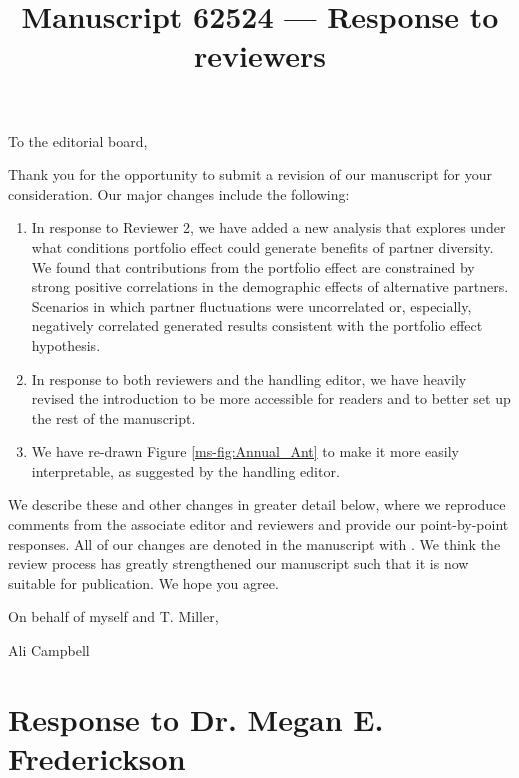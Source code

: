 \documentclass[12pt]{article}
\newcommand{\revise}[1]{{\color{blue}{#1}}}
\begin{document}
\title{Manuscript 62524 --- Response to reviewers}

\maketitle
\noindent To the editorial board,

Thank you for the opportunity to submit a revision of our manuscript for your consideration. Our major changes include the following:
\begin{enumerate}
	\item In response to Reviewer 2, we have added a new analysis that explores under what conditions portfolio effect could generate benefits of partner diversity. We found that contributions from the portfolio effect are constrained by strong positive correlations in the demographic effects of alternative partners. Scenarios in which partner fluctuations were uncorrelated or, especially, negatively correlated generated results consistent with the portfolio effect hypothesis.
	\item In response to both reviewers and the handling editor, we have heavily revised the introduction to be more accessible for readers and to better set up the rest of the manuscript.
	\item We have re-drawn Figure \ref{ms-fig:Annual_Ant} to make it more easily interpretable, as suggested by the handling editor.
\end{enumerate}

We describe these and other changes in greater detail below, where we reproduce comments from the associate editor and reviewers and provide our point-by-point responses. 
All of our changes are denoted in the manuscript with \revise{blue font}.
We think the review process has greatly strengthened our manuscript such that it is now suitable for publication.
We hope you agree. 

\vspace{2em}
\hfill On behalf of myself and T. Miller,

\hfill Ali Campbell
\newpage


\section{Response to Dr. Megan E. Frederickson}
\vspace{-2em}
\end{document}
